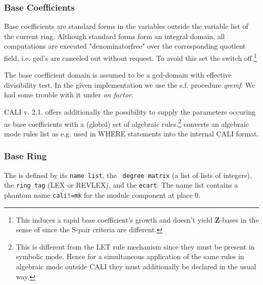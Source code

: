 \subsubsection*{Base Coefficients}

Base coefficients are standard forms in the variables outside the
variable list of the current ring. Although standard forms form an
integral domain, all computations are executed "denominatorfree" over
the corresponding quotient field, i.e. gcd's are canceled out without
request. To avoid this set the switch  off.\footnote{This
induces a rapid base coefficient's growth and doesn't yield {\bf
Z}-\gr bases in the sense of \cite{GTZ} since the S-pair criteria are
different.}

The base coefficient domain is assumed to be a gcd-domain with
effective divisibility test. In the given implementation we use the
s.f. procedure {\em qremf}. We had some trouble with it under {\em on
factor}.

CALI v. 2.1. offers additionally the possibility to supply the
parameters occuring as base coefficients with a (global) set of
algebraic rules.\footnote{This is different from the LET rule
mechanism since they must be present in symbolic mode. Hence for a
simultaneous application of the same rules in algebraic mode outside
CALI they must additionally be declared in the usual way.}
 converts an algebraic mode rules list as e.g. used in
WHERE statements into the internal CALI format.

\subsubsection*{Base Ring}

The  is defined by its {\tt name list}, the {\tt
degree matrix} (a list of lists of integers), the {\tt ring tag} (LEX
or REVLEX), and the {\tt ecart}. The name list contains a phantom
name {\tt cali!=mk} for the module component at place 0.
\medskip

